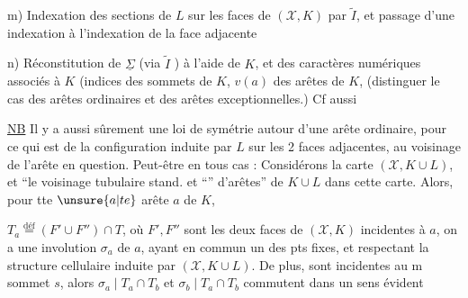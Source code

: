 m) Indexation des sections de $L$ sur les faces de $(\mathcal X,K)$  par $\widetilde I$, et passage d'une indexation à l'indexation de la face adjacente

n) Réconstitution de  $\underline{\Sigma}$ (via $\widetilde I$ \unsure{---}) à l'aide de $K$, et des caractères numériques associés à $K$ (indices des  sommets de $K$,  $v(a)$ des arêtes  de $K$,  (distinguer le cas des arêtes ordinaires et des arêtes exceptionnelles.) Cf aussi

\uline{NB} Il y a aussi sûrement une loi de symétrie autour d'une arête ordinaire, pour ce qui est de la configuration induite par $L$ sur les 2 faces adjacentes, au voisinage de l'arête en question. Peut-être  en tous cas : Considérons la carte $(\mathcal X,K\cup L)$, et ``le voisinage tubulaire stand. et ``'' d'arêtes'' de   $K\cup L$ dans cette carte.  Alors, pour tte $\unsure{a|te}$ arête $a$ de $K$, 


$T_a\overset{\mathrm{déf}}{=}(F'\cup F'')\cap T$, où $F',F''$ sont les deux faces de $(\mathcal X,K)$ incidentes à $a$, on a une involution \deleted{\unsure{$\varphi$}} $\sigma_a$ de $a$, ayant en commun un des pts fixes, et respectant la structure cellulaire induite par $(\mathcal X,K\cup L)$. De plus,  sont incidentes au m sommet $s$, alors $\sigma_a\mid T_a\cap T_b$ et $\sigma_b\mid T_a\cap T_b$ commutent dans un sens évident

